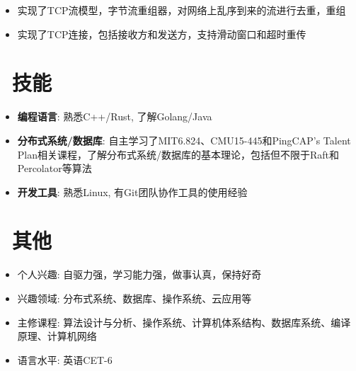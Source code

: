 \documentclass{resume}
\begin{document}
\begin{onehalfspacing}
\begin{itemize}
  \item 实现了TCP流模型，字节流重组器，对网络上乱序到来的流进行去重，重组
  \item 实现了TCP连接，包括接收方和发送方，支持滑动窗口和超时重传
\end{itemize}
\end{onehalfspacing}


\section{\faCogs\ 技能}
\begin{itemize}[parsep=0.5ex]
  \item \textbf{编程语言}: 熟悉C++/Rust, 了解Golang/Java
  \item \textbf{分布式系统/数据库}: 自主学习了MIT6.824、CMU15-445和PingCAP's Talent Plan相关课程，了解分布式系统/数据库的基本理论，包括但不限于Raft和Percolator等算法
  \item \textbf{开发工具}: 熟悉Linux, 有Git团队协作工具的使用经验
\end{itemize}

\section{\faInfo\ 其他}
\begin{itemize}[parsep=0.5ex]
  \item 个人兴趣: 自驱力强，学习能力强，做事认真，保持好奇
  \item 兴趣领域: 分布式系统、数据库、操作系统、云应用等
  \item 主修课程: 算法设计与分析、操作系统、计算机体系结构、数据库系统、编译原理、计算机网络
  \item 语言水平: 英语CET-6
\end{itemize}

%
%
\end{document}
